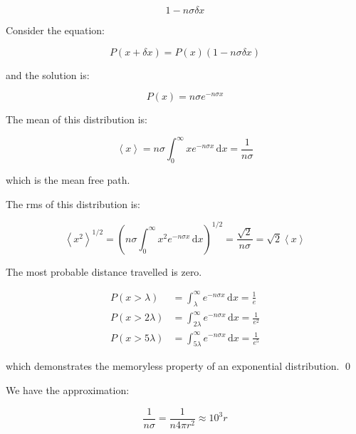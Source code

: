 \documentclass[12pt]{article}
\begin{document}
\begin{equation}
    1 - n \sigma \delta x
\end{equation}

Consider the equation:

\begin{equation}
    P(x + \delta x) = P(x) \left( 1 - n \sigma \delta x \right)
\end{equation}

and the solution is:

\begin{equation}
    P(x) = n \sigma e^{-n \sigma x}
\end{equation}

The mean of this distribution is:

\begin{equation}
    \left\langle x \right\rangle = n \sigma \int_{0}^{\infty} x e^{-n \sigma x} \, \mathrm{d}x = \frac{1}{n \sigma}
\end{equation}

which is the mean free path.

The rms of this distribution is:

\begin{equation}
    \left\langle x^{2} \right\rangle^{1/2} = \left( n \sigma \int_{0}^{\infty} x^{2} e^{-n \sigma x} \, \mathrm{d}x \right)^{1/2} = \frac{\sqrt{2}}{n \sigma} = \sqrt{2} \left\langle x \right\rangle
\end{equation}

The most probable distance travelled is zero.


\begin{equation}
\begin{split}
    P(x > \lambda) &= \int_{\lambda}^{\infty} e^{-n \sigma x} \, \mathrm{d}x = \frac{1}{e} \\
    P(x > 2\lambda) &= \int_{2\lambda}^{\infty} e^{-n \sigma x} \, \mathrm{d}x = \frac{1}{e^{2}} \\
    P(x > 5\lambda) &= \int_{5\lambda}^{\infty} e^{-n \sigma x} \, \mathrm{d}x = \frac{1}{e^{5}}
\end{split}
\end{equation}

which demonstrates the memoryless property of an exponential distribution.
\qed



We have the approximation:

\begin{equation}
    \frac{1}{n\sigma} = \frac{1}{n 4\pi r^{2}} \approx 10^{3} r
\end{equation}
\end{document}
